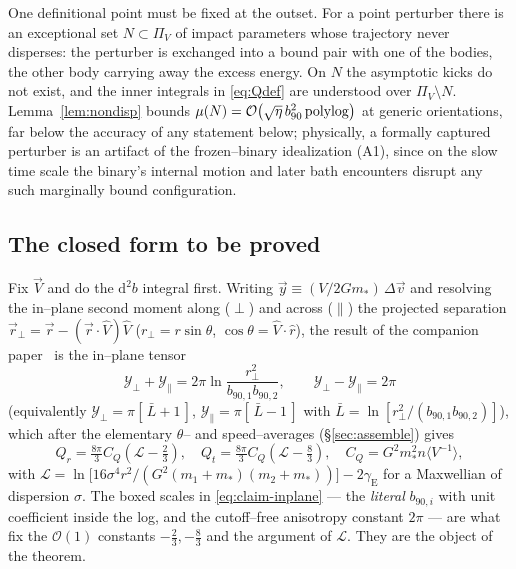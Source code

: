 \documentclass[11pt]{article}
\newcommand{\dd}{\mathrm{d}}
\newcommand{\rp}{r_\perp}
\newcommand{\Vh}{\hat V}
\newcommand{\gE}{\gamma_{\mathrm E}}
\newcommand{\Yp}{\mathcal Y_\perp}
\newcommand{\Ypa}{\mathcal Y_\parallel}
\newcommand{\order}[1]{\mathcal O\!\left(#1\right)}
\begin{document}
One definitional point must be fixed at the outset. For a point perturber there is an exceptional
set $N\subset\Pi_V$ of impact parameters whose trajectory never disperses: the perturber is
exchanged into a bound pair with one of the bodies, the other body carrying away the excess energy.
On $N$ the asymptotic kicks do not exist, and the inner integrals in \eqref{eq:Qdef} are understood
over $\Pi_V\setminus N$. Lemma~\ref{lem:nondisp} bounds $\mu(N)=\order{\sqrt\eta\,b_{90}^2\,
{\rm polylog}}$ at generic orientations, far below the accuracy of any statement below; physically,
a formally captured perturber is an artifact of the frozen--binary idealization (A1), since on the
slow time scale the binary's internal motion and later bath encounters disrupt any such marginally
bound configuration.

\subsection{The closed form to be proved}
Fix $\vec V$ and do the $\dd^2b$ integral first. Writing $\vec y\equiv (V/2Gm_*)\,\Delta\vec v$ and
resolving the in--plane second moment along ($\perp$) and across ($\parallel$) the projected
separation $\vec\rp=\vec r-(\vec r\cdot\Vh)\Vh$ ($\rp=r\sin\theta$, $\cos\theta=\Vh\cdot\hat r$), the
result of the companion paper~\cite{companion} is the in--plane tensor
\begin{equation}
  \boxed{\ \Yp+\Ypa=2\pi\ln\frac{\rp^2}{b_{90,1}b_{90,2}},\qquad \Yp-\Ypa=2\pi\ }
  \label{eq:claim-inplane}
\end{equation}
(equivalently $\Yp=\pi[\,\bar L+1\,]$, $\Ypa=\pi[\,\bar L-1\,]$ with $\bar L=\ln[\rp^2/(b_{90,1}b_{90,2})]$),
which after the elementary $\theta$-- and speed--averages (\S\ref{sec:assemble}) gives
\begin{equation}
  Q_r=\tfrac{8\pi}{3}C_Q\!\left(\mathcal L-\tfrac23\right),\quad
  Q_t=\tfrac{8\pi}{3}C_Q\!\left(\mathcal L-\tfrac83\right),\quad
  C_Q=G^2m_*^2 n\langle V^{-1}\rangle,
  \label{eq:claim-QrQt}
\end{equation}
with $\mathcal L=\ln\!\big[16\sigma^4r^2/(G^2(m_1+m_*)(m_2+m_*))\big]-2\gE$ for a Maxwellian of
dispersion $\sigma$. The boxed scales in \eqref{eq:claim-inplane} --- the \emph{literal} $b_{90,i}$
with unit coefficient inside the log, and the cutoff--free anisotropy constant $2\pi$ --- are what
fix the $\mathcal O(1)$ constants $-\tfrac23,-\tfrac83$ and the argument of $\mathcal L$. They are
the object of the theorem.
\end{document}
